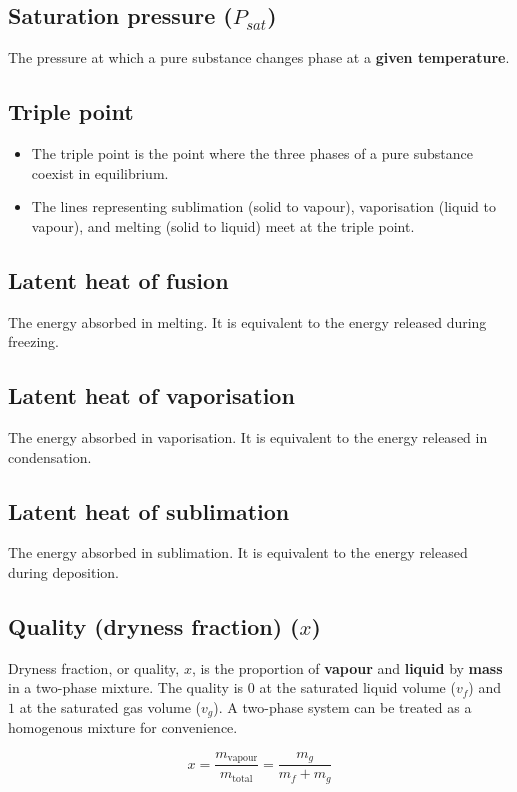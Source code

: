 \documentclass[11pt]{article}
\begin{document}
\subsection{Saturation pressure (\(P_{sat}\))}
\label{sec:orgee939ea}
The pressure at which a pure substance changes phase at a \textbf{given temperature}.
\subsection{Triple point}
\label{sec:org09d5ec5}
\begin{itemize}
\item The triple point is the point where the three phases of a pure substance coexist in equilibrium.
\item The lines representing sublimation (solid to vapour), vaporisation (liquid to vapour), and melting (solid to liquid) meet at the triple point.
\end{itemize}
\subsection{Latent heat of fusion}
\label{sec:org83a2cbb}
The energy absorbed in melting. It is equivalent to the energy released during freezing.
\subsection{Latent heat of vaporisation}
\label{sec:org0a42f34}
The energy absorbed in vaporisation. It is equivalent to the energy released in condensation.
\subsection{Latent heat of sublimation}
\label{sec:orgd76191a}
The energy absorbed in sublimation. It is equivalent to the energy released during deposition.
\subsection{Quality (dryness fraction) (\(x\))}
\label{sec:org3b4fede}
Dryness fraction, or quality, \(x\), is the proportion of \textbf{vapour} and \textbf{liquid} by \textbf{mass} in a two-phase mixture. The quality is \(0\) at the saturated liquid volume (\(v_f\)) and \(1\) at the saturated gas volume (\(v_g\)). A two-phase system can be treated as a homogenous mixture for convenience.

\[x = \frac{m_{\text{vapour}}}{m_{\text{total}}} = \frac{m_g}{m_f + m_g}\]
\end{document}
